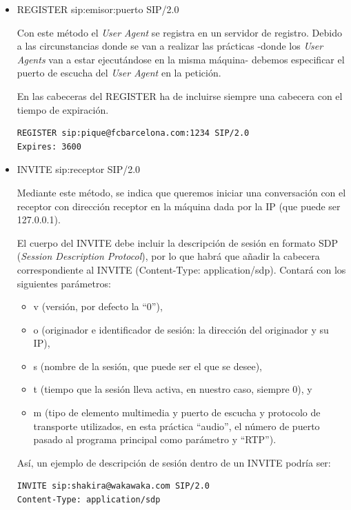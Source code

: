 \documentclass[a4paper,11pt]{article}
\begin{document}
  \begin{itemize}
    \item REGISTER sip:emisor:puerto SIP/2.0

    Con este método el \emph{User Agent} se registra en un servidor de registro. Debido a las circunstancias donde se van a realizar las prácticas -donde los \emph{User Agents} van a estar ejecutándose en la misma máquina- debemos especificar el puerto de escucha del \emph{User Agent} en la petición.

    En las cabeceras del REGISTER ha de incluirse siempre una cabecera con el tiempo de expiración.

\begin{verbatim}
REGISTER sip:pique@fcbarcelona.com:1234 SIP/2.0
Expires: 3600
\end{verbatim}


    \item INVITE sip:receptor SIP/2.0

    Mediante este método, se indica que queremos iniciar una conversación con el receptor con dirección receptor en la máquina dada por la IP (que puede ser 127.0.0.1).

    El cuerpo del INVITE debe incluir la descripción de sesión en formato
 SDP (\emph{Session Description Protocol}), por lo que habrá que añadir la cabecera correspondiente al INVITE (Content-Type: application/sdp). Contará con los siguientes parámetros:

\begin{itemize}
  \item v (versión, por defecto la ``0''),
  \item o (originador e identificador de sesión: la dirección del originador y su IP),
  \item s (nombre de la sesión, que puede ser el que se desee),
  \item t (tiempo que la sesión lleva activa, en nuestro caso, siempre 0), y
  \item m (tipo de elemento multimedia y puerto de escucha y protocolo de transporte utilizados, en esta práctica ``audio'', el número de puerto pasado al programa principal como parámetro y ``RTP'').
\end{itemize}

Así, un ejemplo de descripción de sesión dentro de un INVITE podría ser:

\begin{verbatim}
INVITE sip:shakira@wakawaka.com SIP/2.0
Content-Type: application/sdp


\end{verbatim}
\end{itemize}
\end{document}
